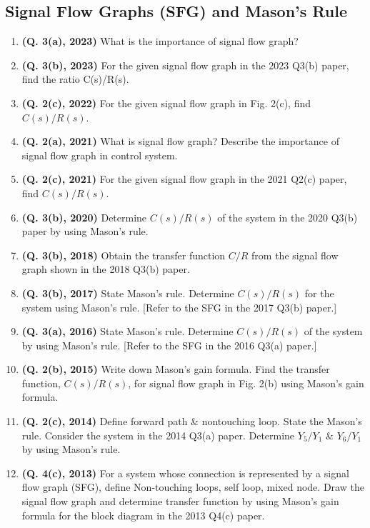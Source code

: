 \documentclass[12pt, a4paper]{article}
\begin{document}
	\subsection{Signal Flow Graphs (SFG) and Mason's Rule}
	\begin{enumerate}
		\item \textbf{(Q. 3(a), 2023)} What is the importance of signal flow graph?
		\item \textbf{(Q. 3(b), 2023)} For the given signal flow graph in the 2023 Q3(b) paper, find the ratio C(s)/R(s).
		\item \textbf{(Q. 2(c), 2022)} For the given signal flow graph in Fig. 2(c), find $C(s)/R(s)$.
		\item \textbf{(Q. 2(a), 2021)} What is signal flow graph? Describe the importance of signal flow graph in control system.
		\item \textbf{(Q. 2(c), 2021)} For the given signal flow graph in the 2021 Q2(c) paper, find $C(s)/R(s)$.
		\item \textbf{(Q. 3(b), 2020)} Determine $C(s)/R(s)$ of the system in the 2020 Q3(b) paper by using Mason's rule.
		\item \textbf{(Q. 3(b), 2018)} Obtain the transfer function $C/R$ from the signal flow graph shown in the 2018 Q3(b) paper.
		\item \textbf{(Q. 3(b), 2017)} State Mason's rule. Determine $C(s)/R(s)$ for the system using Mason's rule. [Refer to the SFG in the 2017 Q3(b) paper.]
		\item \textbf{(Q. 3(a), 2016)} State Mason's rule. Determine $C(s)/R(s)$ of the system by using Mason's rule. [Refer to the SFG in the 2016 Q3(a) paper.]
		\item \textbf{(Q. 2(b), 2015)} Write down Mason's gain formula. Find the transfer function, $C(s)/R(s)$, for signal flow graph in Fig. 2(b) using Mason's gain formula.
		\item \textbf{(Q. 2(c), 2014)} Define forward path \& nontouching loop. State the Mason's rule. Consider the system in the 2014 Q3(a) paper. Determine $Y_5/Y_1$ \& $Y_6/Y_1$ by using Mason's rule.
		\item \textbf{(Q. 4(c), 2013)} For a system whose connection is represented by a signal flow graph (SFG), define Non-touching loops, self loop, mixed node. Draw the signal flow graph and determine transfer function by using Mason's gain formula for the block diagram in the 2013 Q4(c) paper.
	\end{enumerate}
	
	
\end{document}
